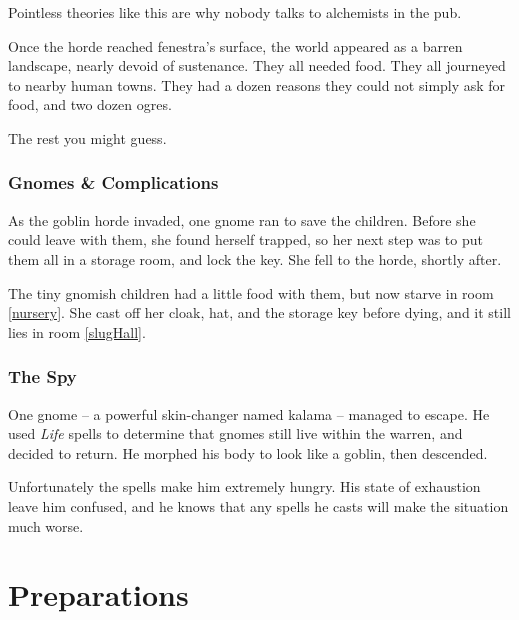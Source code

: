 \begin{multicols}{2}
\begin{exampletext}
{  Pointless theories like this are why nobody talks to alchemists in the pub.}


  Once the horde reached \gls{fenestra}'s surface, the world appeared as a barren landscape, nearly devoid of sustenance.
  They all needed food.
  They all journeyed to nearby human towns.
  They had a dozen reasons they could not simply ask for food, and two dozen ogres.

  The rest you might guess.

\end{exampletext}


\subsubsection{Gnomes \& Complications}
\label{saving_the_children}

\begin{exampletext}
  As the goblin horde invaded, one gnome ran to save the children.
  Before she could leave with them, she found herself trapped, so her next step was to put them all in a storage room, and lock the key.
  She fell to the horde, shortly after.

  The tiny gnomish children had a little food with them, but now starve in room \ref{nursery}.
  She cast off her cloak, hat, and the storage key before dying, and it still lies in room \ref{slugHall}.
\end{exampletext}

\subsubsection{The Spy}
\label{kalama}

\begin{exampletext}
  One gnome -- a powerful skin-changer named \gls{kalama} -- managed to escape.
  He used \textit{Life} spells to determine that gnomes still live within the \gls{warren}, and decided to return.
  He morphed his body to look like a goblin, then descended.

  Unfortunately the spells make him extremely hungry.
  His state of exhaustion leave him confused, and he knows that any spells he casts will make the situation much worse.
\end{exampletext}

\end{multicols}

\section{Preparations}

